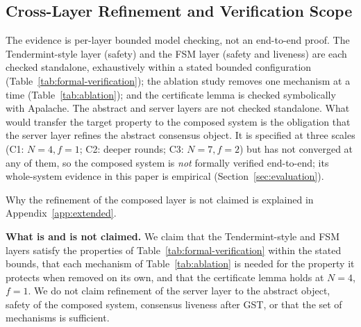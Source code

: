 \subsection{Cross-Layer Refinement and Verification Scope}
\label{subsec:verification-scope}

The evidence is per-layer bounded model checking, not an end-to-end proof. The
Tendermint-style layer (safety) and the FSM layer (safety and liveness) are each
checked standalone, exhaustively within a stated bounded configuration
(Table~\ref{tab:formal-verification}); the ablation study removes one mechanism at
a time (Table~\ref{tab:ablation}); and the certificate lemma is checked
symbolically with Apalache. The abstract and server layers are not checked
standalone. What would transfer the target property to the composed system is the
obligation that the server layer refines the abstract consensus object. It is
specified at three scales (C1: $N{=}4, f{=}1$; C2: deeper rounds; C3:
$N{=}7, f{=}2$) but has not converged at any of them, so the composed system is
\emph{not} formally verified end-to-end; its whole-system evidence in this paper is
empirical (Section~\ref{sec:evaluation}).

Why the refinement of the composed layer is not claimed is explained in Appendix~\ref{app:extended}.

\textbf{What is and is not claimed.} We claim that the Tendermint-style and FSM
layers satisfy the properties of Table~\ref{tab:formal-verification} within the
stated bounds, that each mechanism of Table~\ref{tab:ablation} is needed for the
property it protects when removed on its own, and that the certificate lemma holds
at $N{=}4$, $f{=}1$. We do not claim refinement of the server layer to the
abstract object, safety of the composed system, consensus liveness after GST,
or that the set of mechanisms is sufficient.
